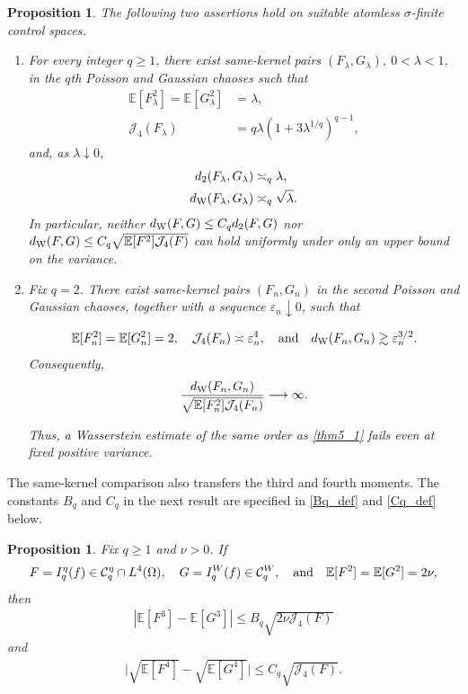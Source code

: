 \documentclass[letterpaper,11pt,reqno]{amsart}
\numberwithin{equation}{section}
\theoremstyle{plain}
\newtheorem{proposition}[theorem]{Proposition}
\theoremstyle{definition}
\theoremstyle{remark}
\newcommand{\E}{\mathbb{E}}
\newcommand{\cC}{\mathcal{C}}
\newcommand{\eps}{\varepsilon}
\newcommand{\noi}{\noindent}
\newcommand{\Jfour}{\mathcal J_4}
\newcommand{\dW}{d_{\rm W}}
\newcommand{\s}{\sigma}
\newcommand{\AND}{\quad{\rm and}\quad}
\begin{document}
\begin{proposition}
\label{prop17}
The following two assertions hold on suitable atomless $\s$-finite
control spaces.

\begin{enumerate}[label=\textup{(\alph*)},leftmargin=2.4em]

\item
For every integer $q\geq1$, there exist same-kernel pairs
$(F_\lambda,G_\lambda)$, $0<\lambda<1$, in the $q$th Poisson and
Gaussian chaoses such that
\noi
\begin{align}
 \E[F_\lambda^2]=\E[G_\lambda^2]
 &=\lambda,
 \label{prop17_1}\\
 \Jfour(F_\lambda)
 &=q\lambda(1+3\lambda^{1/q})^{q-1},
 \label{prop17_2}
\end{align}
and, as $\lambda\downarrow0$,
\noi
\begin{align}
 d_2(F_\lambda,G_\lambda)
 &\asymp_q\lambda,
 \label{prop17_3}\\
 \dW(F_\lambda,G_\lambda)
 &\asymp_q\sqrt{\lambda}.
 \label{prop17_4}
\end{align}
In particular, neither
$\dW(F,G)\leq C_qd_2(F,G)$ nor
$\dW(F,G)\leq C_q\sqrt{\E[F^2]\Jfour(F)}$
can hold uniformly under only an upper bound on the variance.

\item
Fix $q=2$.  There exist
same-kernel pairs $(F_n,G_n)$ in the second Poisson and Gaussian
chaoses, together with a sequence $\eps_n\downarrow0$, such that

\noi
\begin{align*}
 \E[F_n^2]=\E[G_n^2]=2,
 \quad
 \Jfour(F_n)\asymp\eps_n^4,
 \AND
 \dW(F_n,G_n)\gtrsim\eps_n^{3/2}.
\end{align*}
Consequently,
\noi
\begin{align*}
 \frac{\dW(F_n,G_n)}
 {\sqrt{\E[F_n^2]\Jfour(F_n)}}
 \longrightarrow\infty.
\end{align*}

Thus, a Wasserstein estimate of the same order as
\eqref{thm5_1} fails even at fixed positive variance.
\end{enumerate}
\end{proposition}

The same-kernel comparison also transfers the third and fourth
moments.  The constants $B_q$ and $C_q$ in the next result are
specified in \eqref{Bq_def} and \eqref{Cq_def} below.

\begin{proposition}
\label{prop18}
Fix $q\geq1$ and $\nu>0$.  If
\noi
\begin{align*}
 F=I_q^\eta(f)\in\cC_q^\eta\cap L^4(\Omega),
 \quad
 G=I_q^W(f)\in\cC_q^W,
 \AND
 \E[F^2]=\E[G^2]=2\nu,
\end{align*}
then
\noi
\begin{align}\label{prop18_1}
    \left|\E[F^3]-\E[G^3]\right|
 \leq B_q\sqrt{2\nu\Jfour(F)}
\end{align}
and
\begin{align}\label{prop18_2}
\big|  \sqrt{\E[F^4]}-\sqrt{\E[G^4]} \big|
 \leq C_q\sqrt{\Jfour(F)}.
\end{align}
\end{proposition}
\end{document}
